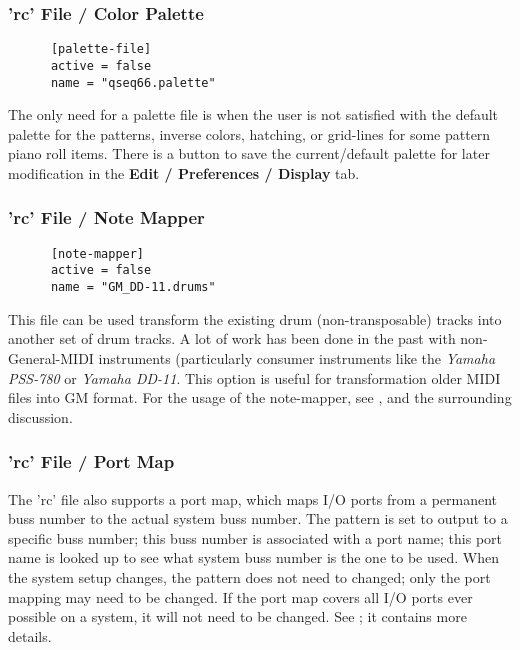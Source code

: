 \subsubsection{'rc' File / Color Palette}
\label{subsubsec:configuration_rc_color_palette}

   \begin{verbatim}
      [palette-file]
      active = false
      name = "qseq66.palette"
   \end{verbatim}

   The only need for a palette file is when the user is not satisfied with the
   default palette for the patterns, inverse colors, hatching,
   or grid-lines for some
   pattern piano roll items.  There is a button to save the current/default
   palette for later modification in the \textbf{Edit / Preferences / Display}
   tab.

\subsubsection{'rc' File / Note Mapper}
\label{subsubsec:configuration_rc_note_mapper}

   \begin{verbatim}
      [note-mapper]
      active = false
      name = "GM_DD-11.drums"
   \end{verbatim}

   This file can be used transform the existing drum (non-transposable) tracks
   into another set of drum tracks.  A lot of work has been done in the past
   with non-General-MIDI instruments (particularly consumer instruments like the
   \textsl{Yamaha PSS-780} or \textsl{Yamaha DD-11}.
   This option is useful for transformation older MIDI files into GM format.
   For the usage of the note-mapper, see
   , and the surrounding
   discussion.

\subsubsection{'rc' File / Port Map}
\label{subsubsec:configuration_rc_port_map}

   The 'rc' file also supports a port map, which maps I/O ports from a
   permanent buss number to the actual system buss number.
   The pattern is set to output to a specific buss number; this buss number is
   associated with a port name; this port name is looked up to see what
   system buss number is the one to be used.  When the system setup changes,
   the pattern does not need to changed; only the port mapping may need to be
   changed.  If the port map covers all I/O ports ever possible on a system, it
   will not need to be changed.  See ; it contains
   more details.

